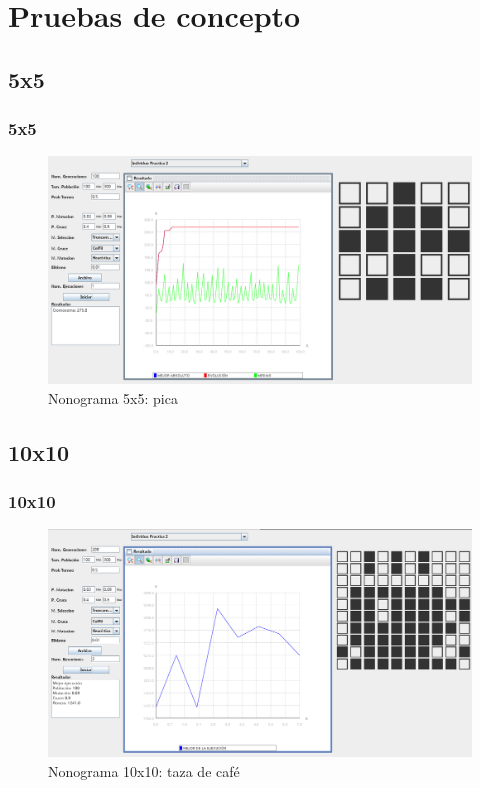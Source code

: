 \documentclass{beamer}
\begin{document}
\section{Pruebas de concepto}
\subsection{5x5}
\begin{frame}
    \frametitle{5x5}
    \begin{figure}
        \includegraphics[width=\textwidth]{Images/5x5.png}
        \caption{Nonograma 5x5: pica}
    \end{figure}
\end{frame}
\subsection{10x10}
\begin{frame}
    \frametitle{10x10}
    \begin{figure}
        \includegraphics[width=\textwidth]{Images/10x10.png}
        \caption{Nonograma 10x10: taza de café}
    \end{figure}
\end{frame}
\end{document}
